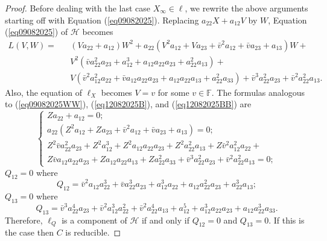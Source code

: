 \documentclass[10pt,a4paper]{amsart}
\begin{document}
\begin{proof}
Before dealing with the last case $X_\infty\in \ell$, we rewrite the above arguments starting off with Equation (\ref{eq09082025}).
Replacing $a_{22}X+a_{12}V$ by $W$, Equation (\ref{eq09082025}) of $\mathcal{H}$ becomes
\begin{equation*}
\label{eq09082025w1}
\begin{array}{llll}L(V,W)=&&(Va_{22}+a_{12})W^2+a_{22}(V^2a_{12}+Va_{23}+\bar{v}^2a_{12}+\bar{v}a_{23}+a_{13})W+\\
&&V^2(\bar{v}a_{22}^2a_{23} + a_{12}^3 + a_{12}a_{22}a_{23} + a_{22}^2a_{13}) +  \\ && V(\bar{v}^2a_{12}^2a_{22} +\bar{v}a_{12}a_{22}a_{23} +a_{12}a_{22}a_{13} + a_{22}^2a_{33}) + \bar{v}^3a_{22}^2a_{23} + \bar{v}^2a_{22}^2a_{13}.
\end{array}
\end{equation*}
Also, the equation of $\ell_X$ becomes $V=v$ for some $v\in \mathbb{F}$. 
The formulas analogous to (\ref{eq09082025WW}), (\ref{eq12082025B}), and (\ref{eq12082025BB}) are
\begin{equation*}
\label{eq09082025WR}
\begin{cases}
Za_{22}+a_{12}=0;\\
a_{22}(Z^2a_{12}+Za_{23}+\bar{v}^2a_{12}+\bar{v}a_{23}+a_{13})=0;\\
Z^2\bar{v}a_{22}^2a_{23} + Z^2a_{12}^3 + Z^2a_{12}a_{22}a_{23} + Z^2a_{22}^2a_{13} + Z\bar{v}^2a_{12}^2a_{22} + \\
Z\bar{v}a_{12}a_{22}a_{23} +Za_{12}a_{22}a_{13} + Za_{22}^2a_{33} + \bar{v}^3a_{22}^2a_{23} + \bar{v}^2a_{22}^2a_{13}=0;
\end{cases}
\end{equation*}
$Q_{12}=0$ where
\begin{equation*}
\label{eq12082025BQ}
Q_{12}=\bar{v}^2a_{12}a_{22}^3 + \bar{v}a_{22}^3a_{23}+ a_{12}^3a_{22} + a_{12}a_{22}^2a_{23} + a_{22}^3a_{13};
\end{equation*}
$Q_{13}=0$ where
\begin{equation*}
\label{eq12082025BBQ}
Q_{13}=\bar{v}^3a_{22}^4a_{23}+ \bar{v}^2a_{12}^3a_{22}^2 + \bar{v}^2a_{22}^4a_{13}+ a_{12}^5 + a_{12}^3a_{22}a_{23} + a_{12}a_{22}^3a_{33}.
\end{equation*}
Therefore, $\ell_Q$ is a component of $\mathcal{H}$ if and only if $Q_{12}=0$ and $Q_{13}=0$. If this is the case then $C$ is reducible.


\end{proof}
\end{document}
